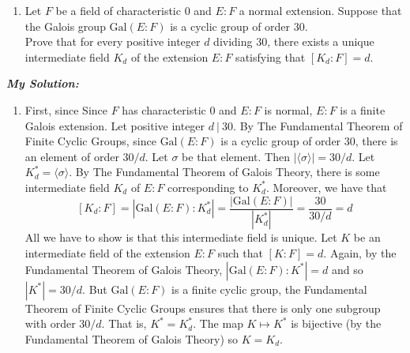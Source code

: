 \documentclass[11pt]{article}
\begin{document}
\begin{enumerate}[resume, label={2.}, left=0pt]
  \item {} Let $F$ be a field of characteristic $0$ and $E:F$ a normal extension. Suppose that the Galois group $\mathrm{Gal}(E:F)$ is a cyclic group of order $30$.\\ [4pt]
  Prove that for every positive integer $d$ dividing $30$, there exists a unique intermediate field $K_{d}$ of the extension $E:F$ satisfying that $[K_{d}:F]=d$.
\end{enumerate}
\textit{\textbf{My Solution:}}
\begin{enumerate}[label={}, left=12pt]
    \item First, since Since $F$ has characteristic $0$ and $E:F$ is normal, $E:F$ is a finite Galois extension. Let positive integer $d \ | \ 30$. By The Fundamental Theorem of Finite Cyclic Groups, since $\text{Gal}(E:F)$ is a cyclic group of order $30$, there is an element of order $30/d$. Let $\sigma$ be that element. Then $|\langle \sigma \rangle | = 30/d$. Let $K_d^* = \langle \sigma \rangle$. By The Fundamental Theorem of Galois Theory, there is some intermediate field $K_d$ of $E:F$ corresponding to $K_d^*$. Moreover, we have that  \[
    [K_d : F] = |\text{Gal}(E:F) : K_d^*| = \frac{|\text{Gal}(E:F)|}{|K_d^*|} = \frac{30}{30/d} = d
    \]
    All we have to show is that this intermediate field is unique. Let $K$ be an intermediate field of the extension $E:F$ such that $[K:F] = d$. Again, by the Fundamental Theorem of Galois Theory, $|\text{Gal}(E:F):K^*| = d$ and so $|K^*| = 30/d$. But $\text{Gal}(E:F)$ is a finite cyclic group, the Fundamental Theorem of Finite Cyclic Groups ensures that there is only one subgroup with order $30/d$. That is, $K^* = K_d^*$. The map $K \mapsto K^*$ is bijective (by the Fundamental Theorem of Galois Theory) so $K = K_d$.
\end{enumerate}
  
  

\newpage
\end{document}
